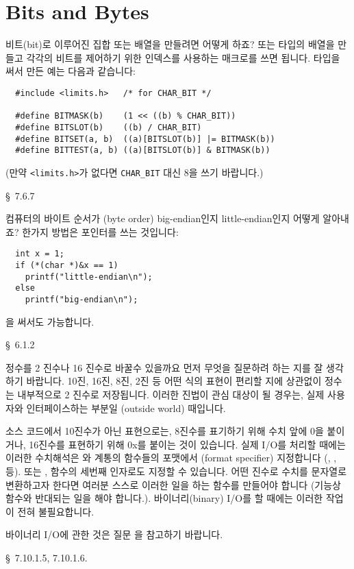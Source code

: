 \section{Bits and Bytes}	\label{sec:bitbyte}

\begin{faq}
	비트(bit)로 이루어진 집합 또는 배열을 만들려면 어떻게 하죠?
\A
	 또는  타입의 배열을 만들고 각각의 비트를
	제어하기 위한 인덱스를 사용하는 매크로를 쓰면 됩니다.
	 타입을 써서 만든 예는 다음과 같습니다:
\begin{verbatim}
  #include <limits.h>   /* for CHAR_BIT */

  #define BITMASK(b)    (1 << ((b) % CHAR_BIT))
  #define BITSLOT(b)    ((b) / CHAR_BIT)
  #define BITSET(a, b)  ((a)[BITSLOT(b)] |= BITMASK(b))
  #define BITTEST(a, b) ((a)[BITSLOT(b)] & BITMASK(b))
\end{verbatim}
	\noindent (만약 \verb+<limits.h>+가 없다면 \verb+CHAR_BIT+ 대신
	8을 쓰기 바랍니다.)

\R
	\cite{hs} \S\ 7.6.7 
\end{faq}

\begin{faq}
	컴퓨터의 바이트 순서가 (byte order) big-endian인지 little-endian인지
	어떻게 알아내죠?
\A
	한가지 방법은 포인터를 쓰는 것입니다:
\begin{verbatim}
  int x = 1;
  if (*(char *)&x == 1)
    printf("little-endian\n");
  else
    printf("big-endian\n");
\end{verbatim}
	\noindent {}을 써서도 가능합니다.

\R
	\cite{hs} \S\ 6.1.2 
\end{faq}

\begin{faq}
	정수를 2 진수나 16 진수로 바꿀수 있을까요
\A
	먼저 무엇을 질문하려 하는 지를 잘 생각하기 바랍니다.
	10진, 16진, 8진, 2진 등 어떤 식의 표현이 편리할 지에 상관없이
	정수는 내부적으로 2 진수로 저장됩니다.
	이러한 진법이 관심 대상이 될 경우는, 실제 사용자와
	인터페이스하는 부분일 (outside world) 때입니다.

	소스 코드에서 10진수가 아닌 표현으로는, 8진수를 표기하기 위해
	수치 앞에 0을 붙이거나, 16진수를 표현하기 위해 0x를 붙이는 것이
	있습니다.  실제 I/O를 처리할 때에는 이러한 수치해석은
	와  계통의 함수들의 포맷에서 (format specifier)
	지정합니다 (, ,  등).  또는 ,
	 함수의 세번째 인자로도 지정할 수 있습니다.
	어떤 진수로 수치를 문자열로 변환하고자 한다면 여러분 스스로
	이러한 일을 하는 함수를 만들어야 합니다 (기능상  함수와
	반대되는 일을 해야 합니다.).  바이너리(binary) I/O를 할 때에는
	이러한 작업이 전혀 불필요합니다.

	바이너리 I/O에 관한 것은 질문 을 참고하기 바랍니다.

\R
	\cite{c89} \S\ 7.10.1.5, 7.10.1.6.
\end{faq}

